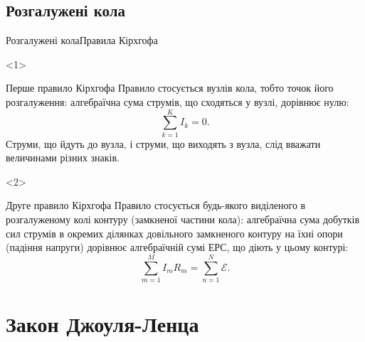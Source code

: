 \documentclass[onlytextwidth]{beamer}
\begin{document}
\subsection{Розгалужені кола}



\begin{frame}{Розгалужені кола}{Правила Кірхгофа}
	\begin{onlyenv}
		\begin{block}{Перше правило Кірхгофа}\justifying
			Правило стосується \alert{вузлів} кола, тобто точок його розгалуження: алгебраїчна сума струмів, що сходяться у вузлі,
			дорівнює нулю:
			\begin{equation*}
				\sum\limits_{k=1}^{K} I_k = 0.
			\end{equation*}
			\alert{Струми, що йдуть до вузла, і струми, що виходять з вузла, слід вважати величинами різних знаків.}
		\end{block}
		\begin{center}
			
		\end{center}
	\end{onlyenv}
	\begin{onlyenv}
		\begin{block}{Друге правило Кірхгофа}\justifying
			Правило стосується будь-якого виділеного в розгалуженому колі \alert{контуру (замкненої частини кола)}: алгебраїчна сума добутків сил
			струмів в окремих ділянках
			довільного замкненого контуру на їхні опори (падіння напруги) дорівнює алгебраїчній сумі ЕРС, що діють у цьому контурі:
			\begin{equation*}
				\sum\limits_{m=1}^{M} I_m R_m = \sum\limits_{n=1}^{N} \mathcal{E}.
			\end{equation*}
		\end{block}
		\begin{center}
			
		\end{center}
	\end{onlyenv}
\end{frame}




\section{Закон Джоуля-Ленца }
\end{document}
